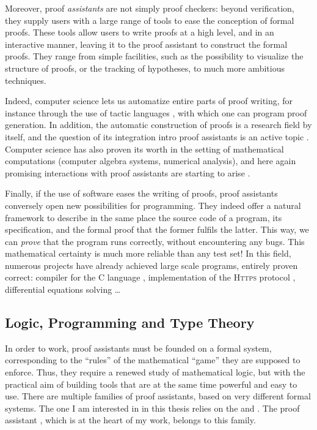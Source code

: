 Moreover, proof \emph{assistants} are not simply proof checkers: beyond verification,
they supply users with a large range of tools to ease the conception of
formal proofs. These tools allow users to write proofs at a
high level, and in an interactive manner,%
leaving it to the proof assistant to construct the formal proofs.
They range from simple facilities, such as the possibility to visualize the structure
of proofs, or the tracking of hypotheses, to much more ambitious techniques.

Indeed, computer science lets us automatize entire parts of
proof writing, for instance through the use of tactic languages ,
with which one can program proof generation.
In addition, the automatic construction of proofs is a research field by itself,
and the question of its integration intro proof assistants is an active topic
. Computer science has also proven its worth in the
setting of mathematical computations (computer algebra systems, numerical analysis),
and here again promising interactions with proof assistants are starting to arise
.

Finally, if the use of software eases the writing of proofs, proof assistants conversely
open new possibilities for programming. They indeed offer a natural framework to describe in
the same place the source code of a program, its specification, and the formal proof that the
former fulfils the latter. This way, we can \emph{prove} that the program runs correctly,
without encountering any bugs.
This mathematical certainty is much more reliable than any test set!
In this field, numerous projects have already achieved large scale programs, entirely proven
correct: compiler for the C language , implementation of the
\textsc{Https} protocol , differential equations solving
…

\subsection{Logic, Programming and Type Theory}

In order to work, proof assistants must be founded on a formal system, corresponding to
the “rules” of the mathematical “game” they are supposed to enforce.
Thus, they require a renewed study of mathematical logic, but with the practical aim of
building tools that are at the same time powerful and easy to use.
There are multiple families of proof assistants, based on very different formal systems.
The one I am interested in in this thesis relies on the 
and . The proof assistant 
, which is at the heart of my work, belongs to this family.

